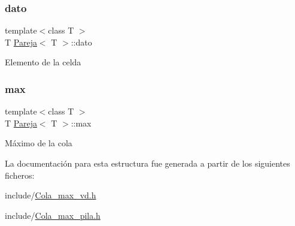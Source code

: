\subsubsection{\texorpdfstring{dato}{dato}}
{\footnotesize\ttfamily template$<$class T $>$ \\
T \hyperlink{structPareja}{Pareja}$<$ T $>$\+::dato}

Elemento de la celda \mbox{\label{structPareja_a96221751f41f7524fba3e22e963e3e4f}} 
\subsubsection{\texorpdfstring{max}{max}}
{\footnotesize\ttfamily template$<$class T $>$ \\
T \hyperlink{structPareja}{Pareja}$<$ T $>$\+::max}

Máximo de la cola 

La documentación para esta estructura fue generada a partir de los siguientes ficheros\+:\begin{DoxyCompactItemize}
\item 
include/\hyperlink{Cola__max__vd_8h}{Cola\+\_\+max\+\_\+vd.\+h}\item 
include/\hyperlink{Cola__max__pila_8h}{Cola\+\_\+max\+\_\+pila.\+h}\end{DoxyCompactItemize}
